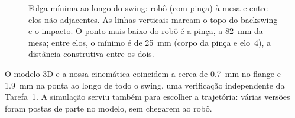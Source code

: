 \begin{figure}[H]
\centering
\begin{minipage}[c]{0.5\textwidth}
\centering
{}
\end{minipage}\hfill
\begin{minipage}[c]{0.47\textwidth}
\caption{Folga mínima ao longo do swing: robô (com pinça) à mesa e entre elos
não adjacentes. As linhas verticais marcam o topo do backswing e o impacto.
O ponto mais baixo do robô é a pinça, a \SI{82}{\milli\meter} da mesa; entre
elos, o mínimo é de \SI{25}{\milli\meter} (corpo da pinça e elo~4), a
distância construtiva entre os dois.}
\label{fig:folgas}
\end{minipage}
\end{figure}

O modelo 3D e a nossa cinemática coincidem a cerca de \SI{0.7}{\milli\meter}
no flange e \SI{1.9}{\milli\meter} na ponta ao longo de todo o swing, uma
verificação independente da Tarefa~1. A simulação serviu também para escolher
a trajetória: várias versões foram postas de parte no modelo, sem chegarem ao
robô.
